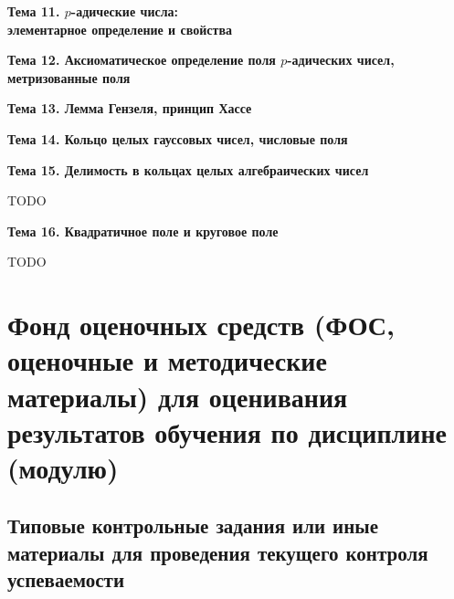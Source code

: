 \documentclass[a4paper, 12pt]{article}
\begin{document}
\begin{center} {\bf Тема 11. $p$-адические числа:\\ элементарное определение и свойства} \end{center}



\begin{center} {\bf Тема 12. Аксиоматическое определение поля $p$-адических чисел,\\ метризованные поля} \end{center}



\begin{center} {\bf Тема 13. Лемма Гензеля, принцип Хассе} \end{center}



\begin{center} {\bf Тема 14. Кольцо целых гауссовых чисел, числовые поля} \end{center}



\begin{center} {\bf Тема 15. Делимость в кольцах целых алгебраических чисел} \end{center} TODO
\begin{center} {\bf Тема 16. Квадратичное поле и круговое поле} \end{center} TODO


\section{Фонд оценочных средств (ФОС, оценочные и методические материалы) для оценивания результатов обучения по дисциплине (модулю)}

\subsection{Типовые контрольные задания или иные материалы для проведения текущего контроля успеваемости}
\end{document}
